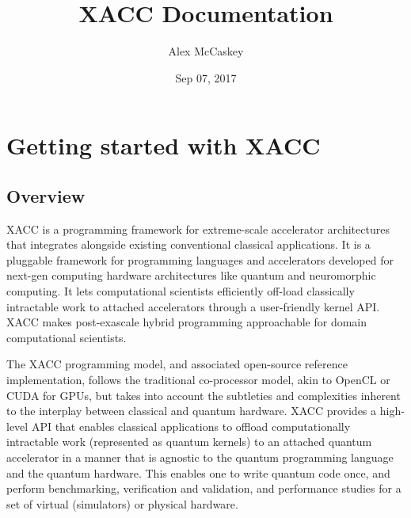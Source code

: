 \documentclass[letterpaper,10pt,english]{sphinxmanual}
\title{XACC Documentation}
\date{Sep 07, 2017}
\author{Alex McCaskey}
\begin{document}
\maketitle
\sphinxtableofcontents
{}\label{\detokenize{index::doc}}



\chapter{Getting started with XACC}
\label{\detokenize{overview:getting-started-with-xacc}}\label{\detokenize{overview::doc}}\label{\detokenize{overview:welcome-to-xacc-s-documentation}}

\section{Overview}
\label{\detokenize{overview:overview}}
XACC is a programming framework for extreme-scale accelerator architectures that integrates alongside existing conventional classical applications. It is a pluggable framework for programming languages and accelerators developed for next-gen computing hardware architectures like quantum and neuromorphic computing. It lets computational scientists efficiently off-load classically intractable work to attached accelerators through a user-friendly kernel API. XACC makes post-exascale hybrid programming approachable for domain computational scientists.

The XACC programming model, and associated open-source reference implementation, follows the traditional co-processor model, akin to OpenCL or CUDA for GPUs, but takes into account the subtleties and complexities inherent to the interplay between classical and quantum hardware. XACC provides a high-level API that enables classical applications to offload computationally intractable work (represented as quantum kernels) to an attached quantum accelerator in a manner that is agnostic to the quantum programming language and the quantum hardware. This enables one to write quantum code once, and perform benchmarking, verification and validation, and performance studies for a set of virtual (simulators) or physical hardware.
\end{document}
